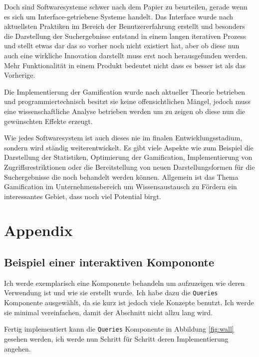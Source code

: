\documentclass[12pt,twoside]{book}
\begin{document}
Doch sind Softwaresysteme schwer nach dem Papier zu beurteilen, gerade wenn es sich um Interface-getriebene Systeme handelt. Das Interface wurde nach aktuellsten Praktiken im Bereich der Benutzererfahrung erstellt und besonders die Darstellung der Suchergebnisse entstand in einem langen iterativen Prozess und stellt etwas dar das so vorher noch nicht existiert hat, aber ob diese nun auch eine wirkliche Innovation darstellt muss erst noch herausgefunden werden. Mehr Funktionalität in einem Produkt bedeutet nicht dass es besser ist als das Vorherige.

Die Implementierung der Gamification wurde nach aktueller Theorie betrieben und programmiertechnisch besitzt sie keine offensichtlichen Mängel, jedoch muss eine wissenschaftliche Analyse betrieben werden um zu zeigen ob diese nun die gewünschten Effekte erzeugt.

Wie jedes Softwaresystem ist auch dieses nie im finalen Entwicklungsstadium, sondern wird ständig weiterentwickelt. Es gibt viele Aspekte wie zum Beispiel die Darstellung der Statistiken, Optimierung der Gamification, Implementierung von Zugriffsrestriktionen oder  die Bereitstellung von neuen Darstellungsformen für die Suchergebnisse die noch behandelt werden können. Allgemein ist das Thema Gamification im Unternehmensbereich um Wissensaustausch zu Fördern ein interessantes Gebiet, dass noch viel Potential birgt.


\chapter{Appendix}

\section{Beispiel einer interaktiven Kompononte}\label{chap:appendix:component}

Ich werde exemplarisch eine Komponente behandeln um aufzuzeigen wie deren Verwendung ist und wie sie erstellt wurde. Ich habe dazu die \texttt{Queries} Komponente ausgewählt, da sie kurz ist jedoch viele Konzepte benutzt. Ich werde sie minimal vereinfachen, damit der Abschnitt nicht allzu lang wird.

Fertig implementiert kann die \texttt{Queries} Komponente in Abbildung \ref{fig:wall} gesehen werden, ich werde nun Schritt für Schritt deren Implementierung angehen.
\end{document}
